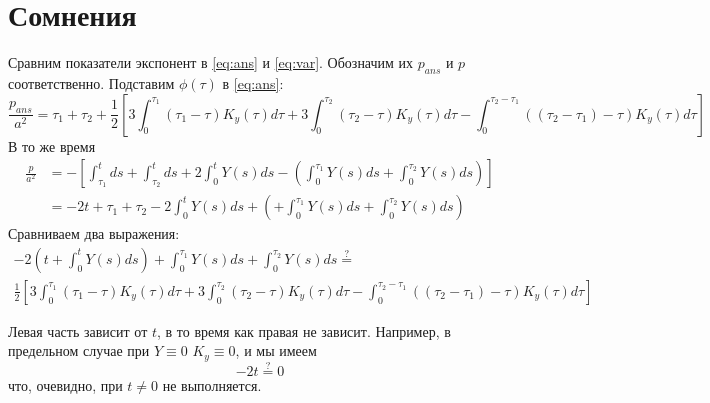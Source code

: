 \documentclass[a4paper,12pt]{article}
\begin{document}
\section{Сомнения}

Сравним показатели экспонент в \eqref{eq:ans} и \eqref{eq:var}.
Обозначим их $ p_{ans} $ и $p$ соответственно.
Подставим $\phi(\tau)$ в \eqref{eq:ans}:
\[ \frac{p_{ans}}{a^2} = \tau_1 + \tau_2 + \frac{1}{2} \left[
    3 \int_{0}^{\tau_1} (\tau_1 - \tau) K_y(\tau) d\tau +
    3 \int_{0}^{\tau_2} (\tau_2 - \tau) K_y(\tau) d\tau -
    \int_{0}^{\tau_2-\tau_1} ((\tau_2-\tau_1) - \tau) K_y(\tau) d\tau \right] \]
В то же время
\begin{align*}
    \frac{p}{a^2} & = - \left[ \int_{\tau_1}^{t} ds + \int_{\tau_2}^{t} ds + 2 \int_{0}^{t} Y(s) ds - \left( \int_{0}^{\tau_1} Y(s) ds + \int_{0}^{\tau_2} Y(s) ds \right) \right] \\
    & = -2t + \tau_1 + \tau_2 - 2 \int_0^t Y(s) ds + \left( + \int_{0}^{\tau_1} Y(s) ds + \int_{0}^{\tau_2} Y(s) ds \right)
\end{align*}
\[  \]
Сравниваем два выражения:
\begin{gather*}
    -2 \left(t+\int_{0}^{t} Y(s) ds \right) + \int_{0}^{\tau_1} Y(s) ds + \int_{0}^{\tau_2} Y(s) ds \overset{?}= \\
    \frac{1}{2} \left[
        3 \int_{0}^{\tau_1} (\tau_1 - \tau) K_y(\tau) d\tau +
        3 \int_{0}^{\tau_2} (\tau_2 - \tau) K_y(\tau) d\tau -
        \int_{0}^{\tau_2-\tau_1} ((\tau_2-\tau_1) - \tau) K_y(\tau) d\tau \right]
\end{gather*}

Левая часть зависит от $t$, в то время как правая не зависит.
Например, в предельном случае при $ Y \equiv 0 $ $ K_y \equiv 0 $, и мы имеем
\[ -2t \overset{?}= 0 \]
что, очевидно, при $t \ne 0$ не выполняется.
\end{document}
